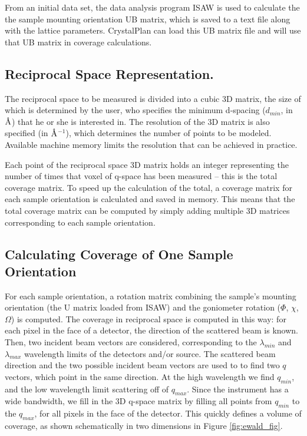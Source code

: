 \documentclass[final]{iucr}              %
\newcommand{\ang}{$\mathrm{\AA} $}
\begin{document}
From an initial data set, the data analysis program ISAW \cite{Tao2006} is used
to calculate the the sample mounting orientation UB matrix, which is saved to a text file along with the lattice
parameters. CrystalPlan can load this UB matrix file and will use that UB matrix
in coverage calculations.
   
  
\subsection{Reciprocal Space Representation.}

The reciprocal space to be measured is divided into a cubic 3D matrix, the size
of which is determined by the user, who specifies the minimum d-spacing
($d_{min}$, in \ang) that he or she is interested in. The resolution of the
3D matrix is also specified (in \ang$^{-1}$), which determines the number of
points to be modeled. Available machine memory limits the resolution that can be achieved in
practice.

Each point of the reciprocal space 3D matrix holds an integer representing the 
number of times that voxel of q-space has been measured – this is the total
coverage matrix. To speed up the calculation of the total, a coverage matrix for
each sample orientation is calculated and saved in memory. This means that the
total coverage matrix can be computed by simply adding multiple 3D matrices
corresponding to each sample orientation. 
 
\subsection{Calculating Coverage of One Sample Orientation}

For each sample orientation, a rotation matrix combining the sample's mounting
orientation (the U matrix loaded from ISAW) and the goniometer rotation
($\Phi$, $\chi$, $\Omega$) is computed. The coverage in reciprocal space is
computed in this way: for each pixel in the face of a detector, the direction of
the scattered beam is known. Then, two incident beam vectors are considered,
corresponding to the $\lambda_{min}$ and $\lambda_{max}$ wavelength limits
of the detectors and/or source. The scattered beam direction and the two possible incident beam vectors
are used to to find two $q$ vectors, which point in the same direction. At the
high wavelength we find $q_{min}$, and the low wavelength limit scattering off
of $q_{max}$. Since the instrument has a wide bandwidth, we fill in the 3D q-space
matrix by filling all points from $q_{min}$ to the $q_{max}$, for all pixels in
the face of the detector. This quickly defines a volume of coverage, as shown
schematically in two dimensions in Figure \ref{fig:ewald_fig}.
\end{document}
